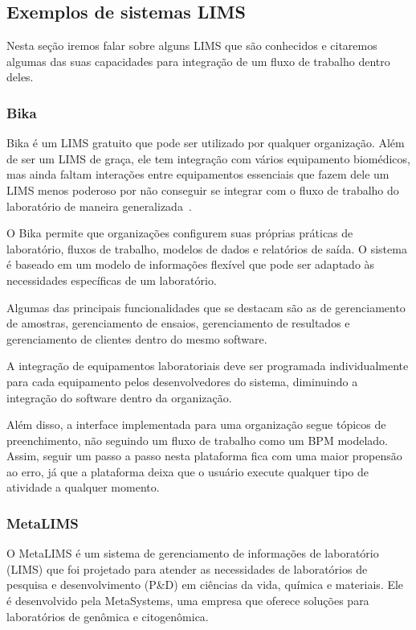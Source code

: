 \subsection{Exemplos de sistemas LIMS} \label{sec:lims-exemplo}

Nesta seção iremos falar sobre alguns LIMS que são conhecidos e citaremos algumas das suas capacidades para integração de um fluxo de trabalho dentro deles.

\subsubsection{Bika}

Bika é um LIMS gratuito que pode ser utilizado por qualquer organização. Além de ser um LIMS de graça, ele tem integração com vários equipamento biomédicos, mas ainda faltam interações entre equipamentos essenciais que fazem dele um LIMS menos poderoso por não conseguir se integrar com o fluxo de trabalho do laboratório de maneira generalizada~\cite{Ademuyiwa2018DevelopmentBiobanking}.

O Bika permite que organizações configurem suas próprias práticas de laboratório, fluxos de trabalho, modelos de dados e relatórios de saída. O sistema é baseado em um modelo de informações flexível que pode ser adaptado às necessidades específicas de um laboratório.

Algumas das principais funcionalidades que se destacam são as de gerenciamento de amostras, gerenciamento de ensaios, gerenciamento de resultados e gerenciamento de clientes dentro do mesmo software.

A integração de equipamentos laboratoriais deve ser programada individualmente para cada equipamento pelos desenvolvedores do sistema, diminuindo a integração do software dentro da organização.

Além disso, a interface implementada para uma organização segue tópicos de preenchimento, não seguindo um fluxo de trabalho como um BPM modelado. Assim, seguir um passo a passo nesta plataforma fica com uma maior propensão ao erro, já que a plataforma deixa que o usuário execute qualquer tipo de atividade a qualquer momento.

\subsubsection{MetaLIMS}

O MetaLIMS é um sistema de gerenciamento de informações de laboratório (LIMS) que foi projetado para atender as necessidades de laboratórios de pesquisa e desenvolvimento (P\&D) em ciências da vida, química e materiais. Ele é desenvolvido pela MetaSystems, uma empresa que oferece soluções para laboratórios de genômica e citogenômica.

